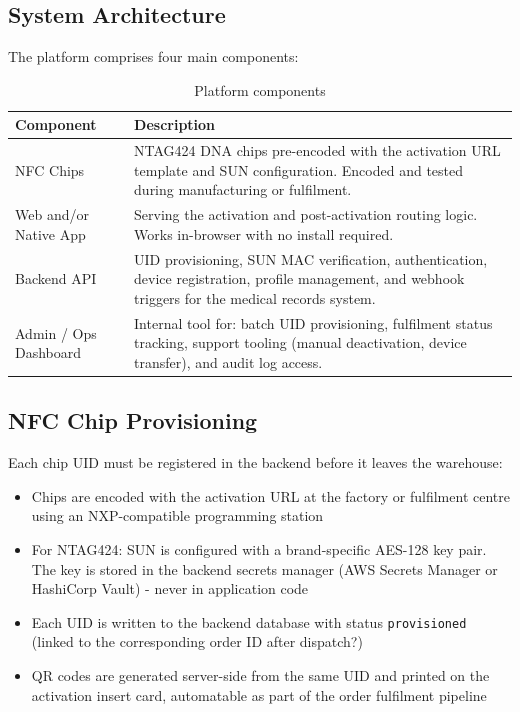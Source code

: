 \documentclass[
	a4paper, %
]{ChaosEngineReport}
\begin{document}
\subsection{System Architecture}

The platform comprises four main components:

\begin{table}[h!]
\centering
\small
{}
\begin{tabularx}{\linewidth}{@{} L{3.0cm} X @{}}
  \toprule
  \textbf{Component} &
  \textbf{Description} \\
  \midrule
  NFC Chips & NTAG424 DNA chips pre-encoded with the activation URL template and SUN configuration. Encoded and tested during manufacturing or fulfilment. \\
  Web and/or Native App & Serving the activation and post-activation routing logic. Works in-browser with no install required. \\
  Backend API & UID provisioning, SUN MAC verification, authentication, device registration, profile management, and webhook triggers for the medical records system. \\
  Admin / Ops Dashboard & Internal tool for: batch UID provisioning, fulfilment status tracking, support tooling (manual deactivation, device transfer), and audit log access. \\
\end{tabularx}
\caption{Platform components}
\end{table}

\subsection{NFC Chip Provisioning}

Each chip UID must be registered in the backend before it leaves the warehouse:

\begin{itemize}
  \item Chips are encoded with the activation URL at the factory or fulfilment centre using an NXP-compatible programming station
  \item For NTAG424: SUN is configured with a brand-specific AES-128 key pair. The key is stored in the backend secrets manager (AWS Secrets Manager or HashiCorp Vault) - never in application code
  \item Each UID is written to the backend database with status \texttt{provisioned} (linked to the corresponding order ID after dispatch?)
  \item QR codes are generated server-side from the same UID and printed on the activation insert card, automatable as part of the order fulfilment pipeline
\end{itemize}
\end{document}
